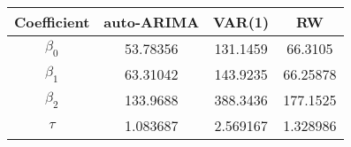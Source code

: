 \begin{tabular}{|c | c c c|} 
    \hline
    Coefficient & auto-ARIMA & VAR(1) & RW \\
    \hline
    $\beta_0$ & 53.78356 & 131.1459 & 66.3105 \\ 
    \hline
    $\beta_1$ & 63.31042 & 143.9235 & 66.25878 \\
    \hline
    $\beta_2$ & 133.9688 & 388.3436 & 177.1525 \\
    \hline
    $\tau$ & 1.083687 & 2.569167 & 1.328986 \\
    \hline
\end{tabular}